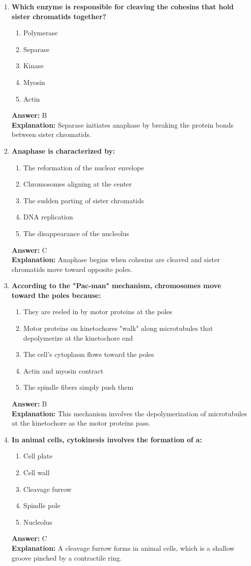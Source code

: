 \documentclass[11pt, a4paper]{article}
\begin{document}
\begin{enumerate}[leftmargin=*, label=\arabic*.]
\item \textbf{Which enzyme is responsible for cleaving the cohesins that hold sister chromatids together?}
\begin{enumerate}[label=\Alph*.]
\item Polymerase
\item Separase
\item Kinase
\item Myosin
\item Actin
\end{enumerate}
\textbf{Answer:} B \\
\textbf{Explanation:} Separase initiates anaphase by breaking the protein bonds between sister chromatids.

\item \textbf{Anaphase is characterized by:}
\begin{enumerate}[label=\Alph*.]
\item The reformation of the nuclear envelope
\item Chromosomes aligning at the center
\item The sudden parting of sister chromatids
\item DNA replication
\item The disappearance of the nucleolus
\end{enumerate}
\textbf{Answer:} C \\
\textbf{Explanation:} Anaphase begins when cohesins are cleaved and sister chromatids move toward opposite poles.

\item \textbf{According to the "Pac-man" mechanism, chromosomes move toward the poles because:}
\begin{enumerate}[label=\Alph*.]
\item They are reeled in by motor proteins at the poles
\item Motor proteins on kinetochores "walk" along microtubules that depolymerize at the kinetochore end
\item The cell's cytoplasm flows toward the poles
\item Actin and myosin contract
\item The spindle fibers simply push them
\end{enumerate}
\textbf{Answer:} B \\
\textbf{Explanation:} This mechanism involves the depolymerization of microtubules at the kinetochore as the motor proteins pass.

\item \textbf{In animal cells, cytokinesis involves the formation of a:}
\begin{enumerate}[label=\Alph*.]
\item Cell plate
\item Cell wall
\item Cleavage furrow
\item Spindle pole
\item Nucleolus
\end{enumerate}
\textbf{Answer:} C \\
\textbf{Explanation:} A cleavage furrow forms in animal cells, which is a shallow groove pinched by a contractile ring.


\end{enumerate}
\end{document}
